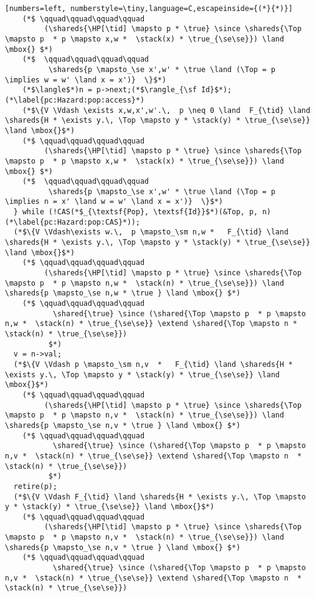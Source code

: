 \begin{figure*}
{\begin{lstlisting}[numbers=left, numberstyle=\tiny,language=C,escapeinside={(*}{*)}]
    (*$ \qquad\qquad\qquad\qquad 
         (\shareds{\HP[\tid] \mapsto p * \true} \since \shareds{\Top \mapsto p  * p \mapsto x,w *  \stack(x) * \true_{\se\se}}) \land  \mbox{} $*)
    (*$  \qquad\qquad\qquad\qquad 
          \shareds{p \mapsto_\se x',w' * \true \land (\Top = p \implies w = w' \land x = x')}  \}$*)       
    (*$\langle$*)n = p->next;(*$\rangle_{\sf Id}$*); (*\label{pc:Hazard:pop:access}*)
    (*$\{V \Vdash \exists x,w,x',w'.\,  p \neq 0 \land  F_{\tid} \land \shareds{H * \exists y.\, \Top \mapsto y * \stack(y) * \true_{\se\se}} \land \mbox{}$*)
    (*$ \qquad\qquad\qquad\qquad 
         (\shareds{\HP[\tid] \mapsto p * \true} \since \shareds{\Top \mapsto p  * p \mapsto x,w *  \stack(x) * \true_{\se\se}}) \land  \mbox{} $*)
    (*$  \qquad\qquad\qquad\qquad 
          \shareds{p \mapsto_\se x',w' * \true \land (\Top = p \implies n = x' \land w = w' \land x = x')}  \}$*)       
  } while (!CAS(*$_{\textsf{Pop}, \textsf{Id}}$*)(&Top, p, n)(*\label{pc:Hazard:pop:CAS}*));
  (*$\{V \Vdash\exists w.\,  p \mapsto_\sm n,w *   F_{\tid} \land \shareds{H * \exists y.\, \Top \mapsto y * \stack(y) * \true_{\se\se}} \land \mbox{}$*)
    (*$ \qquad\qquad\qquad\qquad 
         (\shareds{\HP[\tid] \mapsto p * \true} \since \shareds{\Top \mapsto p  * p \mapsto n,w *  \stack(n) * \true_{\se\se}}) \land \shareds{p \mapsto_\se n,w * \true } \land \mbox{} $*)
    (*$ \qquad\qquad\qquad\qquad 
           \shared{\true} \since (\shared{\Top \mapsto p  * p \mapsto n,w *  \stack(n) * \true_{\se\se}} \extend \shared{\Top \mapsto n *  \stack(n) * \true_{\se\se}}) 
          $*)          
  v = n->val;
  (*$\{V \Vdash p \mapsto_\sm n,v  *   F_{\tid} \land \shareds{H * \exists y.\, \Top \mapsto y * \stack(y) * \true_{\se\se}} \land \mbox{}$*)
    (*$ \qquad\qquad\qquad\qquad 
         (\shareds{\HP[\tid] \mapsto p * \true} \since \shareds{\Top \mapsto p  * p \mapsto n,v *  \stack(n) * \true_{\se\se}}) \land \shareds{p \mapsto_\se n,v * \true } \land \mbox{} $*)
    (*$ \qquad\qquad\qquad\qquad 
           \shared{\true} \since (\shared{\Top \mapsto p  * p \mapsto n,v *  \stack(n) * \true_{\se\se}} \extend \shared{\Top \mapsto n  *  \stack(n) * \true_{\se\se}}) 
          $*)          
  retire(p);
  (*$\{V \Vdash F_{\tid} \land \shareds{H * \exists y.\, \Top \mapsto y * \stack(y) * \true_{\se\se}} \land \mbox{}$*)
    (*$ \qquad\qquad\qquad\qquad 
         (\shareds{\HP[\tid] \mapsto p * \true} \since \shareds{\Top \mapsto p  * p \mapsto n,v *  \stack(n) * \true_{\se\se}}) \land \shareds{p \mapsto_\se n,v * \true } \land \mbox{} $*)
    (*$ \qquad\qquad\qquad\qquad 
           \shared{\true} \since (\shared{\Top \mapsto p  * p \mapsto n,v *  \stack(n) * \true_{\se\se}} \extend \shared{\Top \mapsto n  *  \stack(n) * \true_{\se\se}}) 

\end{lstlisting}}
\end{figure*}
